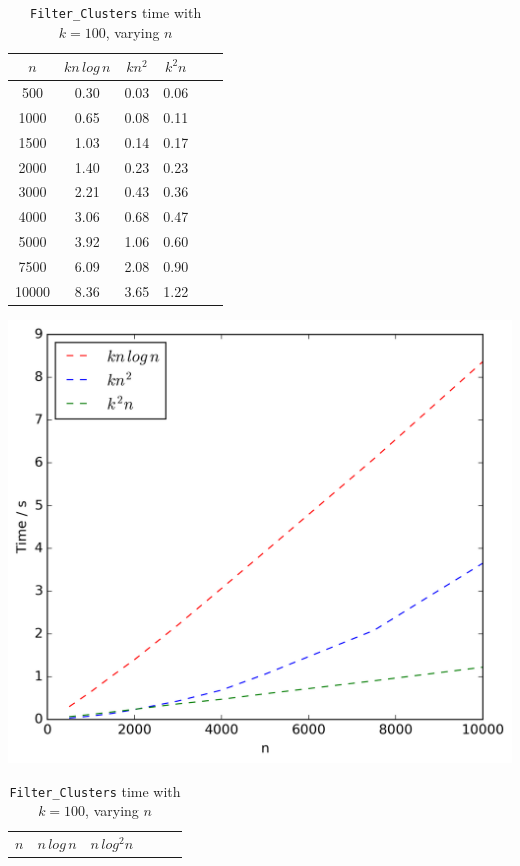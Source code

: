 \documentclass{article}
\begin{document}
\begin{table}[!ht]
\begin{minipage}{0.48\textwidth}
            \label{tab:weightn1}
            \begin{tabular}{c||ccccc}
                $n$ & $kn\,log\,n$ & $kn^2$ & $k^2n$\\
                \hline\hline
                500 & 0.30 & 0.03 & 0.06\\
                1000 & 0.65 & 0.08 & 0.11\\
                1500 & 1.03 & 0.14 & 0.17\\
                2000 & 1.40 & 0.23 & 0.23\\
                3000 & 2.21 & 0.43 & 0.36\\
                4000 & 3.06 & 0.68 & 0.47\\
                5000 & 3.92 & 1.06 & 0.60\\
                7500 & 6.09 & 2.08 & 0.90\\
                10000 & 8.36 & 3.65 & 1.22\\
            \end{tabular}
            \includegraphics[scale=0.4]{varyingn1_weighting}
        \end{minipage}\hfill
        \begin{minipage}{0.48\textwidth}
            \centering
            \caption{\texttt{Filter\_Clusters} time with $k = 100$, varying $n$}
            \label{tab:filtern1}
            \begin{tabular}{c||ccccc}
                $n$ & $n\,log\,n$ & $n\,log^2n$\\

\end{tabular}
\end{minipage}
\end{table}
\end{document}
